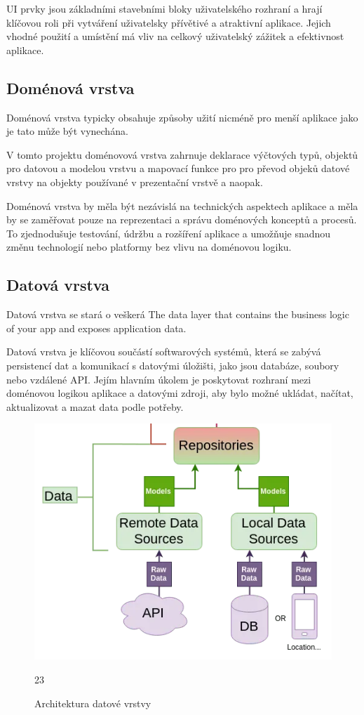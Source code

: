 UI prvky jsou základními stavebními bloky uživatelského rozhraní a hrají klíčovou roli při vytváření uživatelsky přívětivé a atraktivní aplikace. 
Jejich vhodné použití a umístění má vliv na celkový uživatelský zážitek a efektivnost aplikace.

\subsection*{Doménová vrstva}
Doménová vrstva typicky obsahuje způsoby užití nicméně pro menší aplikace jako je tato může být vynechána. 

V tomto projektu doménovová vrstva zahrnuje deklarace výčtových typů, objektů pro datovou a modelou vrstvu a mapovací funkce pro pro převod
objeků datové vrstvy na objekty používané v prezentační vrstvě a naopak.

Doménová vrstva by měla být nezávislá na technických aspektech aplikace a měla by se zaměřovat pouze na reprezentaci a správu doménových
 konceptů a procesů. To zjednodušuje testování, údržbu a rozšíření aplikace a umožňuje snadnou změnu technologií nebo platformy bez 
 vlivu na doménovou logiku.

\subsection*{Datová vrstva}
Datová vrstva se stará o veškerá 
The data layer that contains the business logic of your app and exposes application data.


Datová vrstva je klíčovou součástí softwarových systémů, která se zabývá persistencí dat a komunikací s datovými úložišti, jako jsou
 databáze, soubory nebo vzdálené API. Jejím hlavním úkolem je poskytovat rozhraní mezi doménovou logikou aplikace a datovými zdroji, 
 aby bylo možné ukládat, načítat, aktualizovat a mazat data podle potřeby.



\begin{figure}[H]
  \centering
  \includegraphics[width=.5\textwidth]{data_layer_diagram.png}
  \caption{Architektura datové vrstvy}
  \label{fig:arch_data_layer}23
\end{figure}

